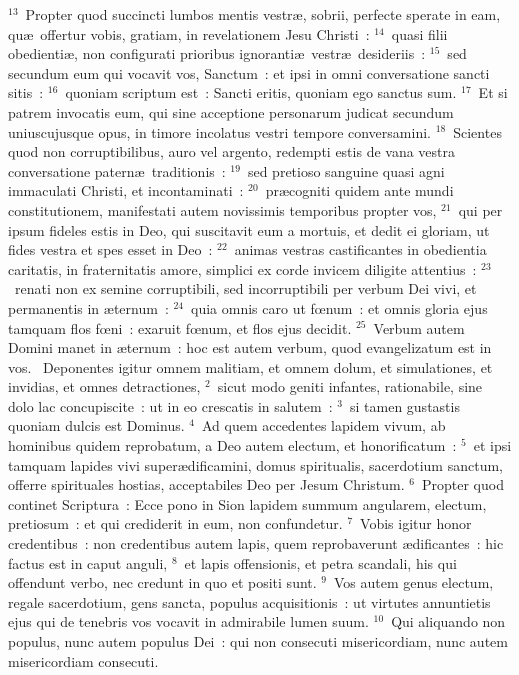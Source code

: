 ${}^{13}$~Propter quod succincti lumbos mentis vestr\ae , sobrii, perfecte sperate in eam, qu\ae\ offertur vobis, gratiam, in revelationem Jesu Christi~:
${}^{14}$~quasi filii obedienti\ae , non configurati prioribus ignoranti\ae\ vestr\ae\ desideriis~:
${}^{15}$~sed secundum eum qui vocavit vos, Sanctum~: et ipsi in omni conversatione sancti sitis~:
${}^{16}$~quoniam scriptum est~: Sancti eritis, quoniam ego sanctus sum.
${}^{17}$~Et si patrem invocatis eum, qui sine acceptione personarum judicat secundum uniuscujusque opus, in timore incolatus vestri tempore conversamini.
${}^{18}$~Scientes quod non corruptibilibus, auro vel argento, redempti estis de vana vestra conversatione patern\ae\ traditionis~:
${}^{19}$~sed pretioso sanguine quasi agni immaculati Christi, et incontaminati~:
${}^{20}$~pr\ae cogniti quidem ante mundi constitutionem, manifestati autem novissimis temporibus propter vos,
${}^{21}$~qui per ipsum fideles estis in Deo, qui suscitavit eum a mortuis, et dedit ei gloriam, ut fides vestra et spes esset in Deo~:
${}^{22}$~animas vestras castificantes in obedientia caritatis, in fraternitatis amore, simplici ex corde invicem diligite attentius~:
${}^{23}$~renati non ex semine corruptibili, sed incorruptibili per verbum Dei vivi, et permanentis in \ae ternum~:
${}^{24}$~quia omnis caro ut fœnum~: et omnis gloria ejus tamquam flos fœni~: exaruit fœnum, et flos ejus decidit.
${}^{25}$~Verbum autem Domini manet in \ae ternum~: hoc est autem verbum, quod evangelizatum est in vos.
~\lettrine[lines=10,image=true,loversize=0.05,lraise=-0.03]{D}{}eponentes igitur omnem malitiam, et omnem dolum, et simulationes, et invidias, et omnes detractiones,
${}^{2}$~sicut modo geniti infantes, rationabile, sine dolo lac concupiscite~: ut in eo crescatis in salutem~:
${}^{3}$~si tamen gustastis quoniam dulcis est Dominus.
${}^{4}$~Ad quem accedentes lapidem vivum, ab hominibus quidem reprobatum, a Deo autem electum, et honorificatum~:
${}^{5}$~et ipsi tamquam lapides vivi super\ae dificamini, domus spiritualis, sacerdotium sanctum, offerre spirituales hostias, acceptabiles Deo per Jesum Christum.
${}^{6}$~Propter quod continet Scriptura~: Ecce pono in Sion lapidem summum angularem, electum, pretiosum~: et qui crediderit in eum, non confundetur.
${}^{7}$~Vobis igitur honor credentibus~: non credentibus autem lapis, quem reprobaverunt \ae dificantes~: hic factus est in caput anguli,
${}^{8}$~et lapis offensionis, et petra scandali, his qui offendunt verbo, nec credunt in quo et positi sunt.
${}^{9}$~Vos autem genus electum, regale sacerdotium, gens sancta, populus acquisitionis~: ut virtutes annuntietis ejus qui de tenebris vos vocavit in admirabile lumen suum.
${}^{10}$~Qui aliquando non populus, nunc autem populus Dei~: qui non consecuti misericordiam, nunc autem misericordiam consecuti.


